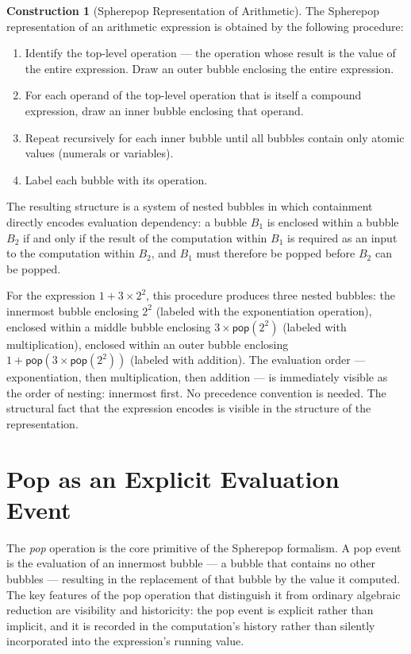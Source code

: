 \documentclass[12pt,openany]{book}
\theoremstyle{plain}
\theoremstyle{definition}
\newtheorem{construction}[theorem]{Construction}
\theoremstyle{remark}
\newcommand{\spop}[1]{\mathsf{pop}\!\left(#1\right)}
\begin{document}
\begin{construction}[Spherepop Representation of Arithmetic]
The Spherepop representation of an arithmetic expression is obtained by the following procedure:
\begin{enumerate}[label=(\arabic*)]
  \item Identify the top-level operation — the operation whose result is the value of the entire expression. Draw an outer bubble enclosing the entire expression.
  \item For each operand of the top-level operation that is itself a compound expression, draw an inner bubble enclosing that operand.
  \item Repeat recursively for each inner bubble until all bubbles contain only atomic values (numerals or variables).
  \item Label each bubble with its operation.
\end{enumerate}
The resulting structure is a system of nested bubbles in which containment directly encodes evaluation dependency: a bubble $B_1$ is enclosed within a bubble $B_2$ if and only if the result of the computation within $B_1$ is required as an input to the computation within $B_2$, and $B_1$ must therefore be popped before $B_2$ can be popped.
\end{construction}

For the expression $1 + 3 \times 2^2$, this procedure produces three nested bubbles: the innermost bubble enclosing $2^2$ (labeled with the exponentiation operation), enclosed within a middle bubble enclosing $3 \times \spop{2^2}$ (labeled with multiplication), enclosed within an outer bubble enclosing $1 + \spop{3 \times \spop{2^2}}$ (labeled with addition). The evaluation order — exponentiation, then multiplication, then addition — is immediately visible as the order of nesting: innermost first. No precedence convention is needed. The structural fact that the expression encodes is visible in the structure of the representation.

\section{Pop as an Explicit Evaluation Event}

The \emph{pop} operation is the core primitive of the Spherepop formalism. A pop event is the evaluation of an innermost bubble — a bubble that contains no other bubbles — resulting in the replacement of that bubble by the value it computed. The key features of the pop operation that distinguish it from ordinary algebraic reduction are visibility and historicity: the pop event is explicit rather than implicit, and it is recorded in the computation's history rather than silently incorporated into the expression's running value.
\end{document}
